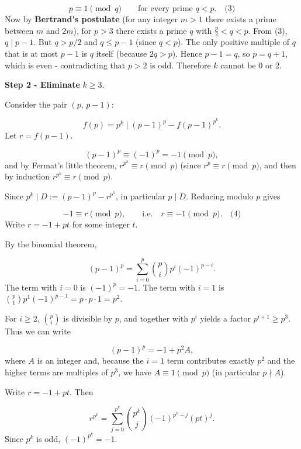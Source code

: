 \[
p\equiv 1\pmod q \qquad\text{for every prime } q<p. \quad\text{(3)}
\]
Now by \textbf{Bertrand's postulate} (for any integer \(m>1\) there exists a prime between \(m\) and \(2m\)), for \(p>3\) there exists a prime \(q\) with \(\frac{p}{2}<q<p\). From (3), \(q\mid p-1\). But \(q>p/2\) and \(q\le p-1\) (since \(q<p\)). The only positive multiple of \(q\) that is at most \(p-1\) is \(q\) itself (because \(2q>p\)). Hence \(p-1=q\), so \(p=q+1\), which is even - contradicting that \(p>2\) is odd. Therefore \(k\) cannot be \(0\) or \(2\).\par
\smallskip
\textbf{Step 2 - Eliminate }\(k\ge3\).\textbf{}\par
Consider the pair \((p,\,p-1)\):\par
\[
f(p)=p^{k}\mid (p-1)^{p} - f(p-1)^{p^{k}}.
\]
Let \(r = f(p-1)\).\par
{}
\[
  (p-1)^{p}\equiv (-1)^{p} = -1\pmod p,
  \]
and by Fermat's little theorem, \(r^{p^{k}}\equiv r\pmod p\) (since \(r^{p}\equiv r\pmod p\), and then by induction \(r^{p^{k}}\equiv r\pmod p\).\par
Since \(p^{k}\mid D := (p-1)^{p} - r^{p^{k}}\), in particular \(p\mid D\). Reducing modulo \(p\) gives\par
\[
  -1 \equiv r \pmod p,\qquad\text{i.e.}\quad r\equiv -1\pmod p. \quad\text{(4)}
  \]
Write \(r = -1 + p t\) for some integer \(t\).\par
{}
By the binomial theorem,\par
\[
  (p-1)^{p} = \sum_{i=0}^{p}\binom{p}{i}p^{i}(-1)^{p-i}.
  \]
The term with \(i=0\) is \((-1)^{p} = -1\). The term with \(i=1\) is \(\binom{p}{1}p^{1}(-1)^{p-1} = p\cdot p\cdot1 = p^{2}\).\par
For \(i\ge2\), \(\binom{p}{i}\) is divisible by \(p\), and together with \(p^{i}\) yields a factor \(p^{i+1}\ge p^{3}\). Thus we can write\par
\[
  (p-1)^{p} = -1 + p^{2} A,
  \]
where \(A\) is an integer and, because the \(i=1\) term contributes exactly \(p^{2}\) and the higher terms are multiples of \(p^{3}\), we have \(A\equiv 1\pmod p\) (in particular \(p\nmid A\)).\par
{}
Write \(r = -1 + p t\). Then\par
\[
  r^{p^{k}} = \sum_{j=0}^{p^{k}}\binom{p^{k}}{j}(-1)^{p^{k}-j}(p t)^{j}.
  \]
Since \(p^{k}\) is odd, \((-1)^{p^{k}} = -1\).\par
